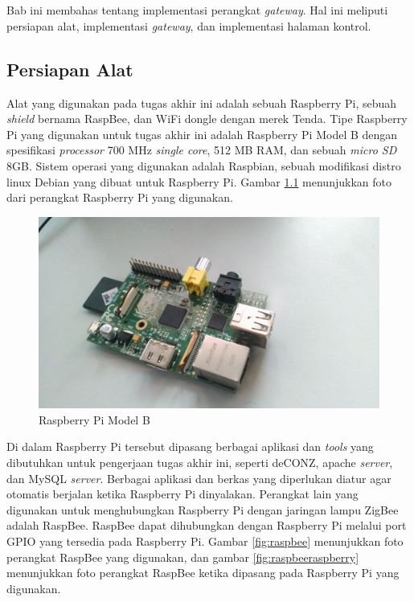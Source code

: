 \chapter{\babEmpat}
Bab ini membahas tentang implementasi perangkat \textit{gateway}. Hal ini meliputi persiapan alat, implementasi \textit{gateway}, dan implementasi halaman kontrol.

\section{Persiapan Alat}
Alat yang digunakan pada tugas akhir ini adalah sebuah Raspberry Pi, sebuah \textit{shield} bernama RaspBee, dan WiFi dongle dengan merek Tenda. Tipe Raspberry Pi yang digunakan untuk tugas akhir ini adalah Raspberry Pi Model B dengan spesifikasi \textit{processor} 700 MHz \textit{single core}, 512 MB RAM, dan sebuah \textit{micro SD} 8GB. Sistem operasi yang digunakan adalah Raspbian, sebuah modifikasi distro linux Debian yang dibuat untuk Raspberry Pi. Gambar \ref{fig:raspberry} menunjukkan foto dari perangkat Raspberry Pi yang digunakan.

\begin{figure}
	\centering
	\includegraphics[width=.9\textwidth]{pics/raspberry.jpg}
	\caption{Raspberry Pi Model B}
	\label{fig:raspberry}
\end{figure}

Di dalam Raspberry Pi tersebut dipasang berbagai aplikasi dan \textit{tools} yang dibutuhkan untuk pengerjaan tugas akhir ini, seperti deCONZ, apache \textit{server}, dan MySQL \textit{server}. Berbagai aplikasi dan berkas yang diperlukan diatur agar otomatis berjalan ketika Raspberry Pi dinyalakan. Perangkat lain yang digunakan untuk menghubungkan Raspberry Pi dengan jaringan lampu ZigBee adalah RaspBee. RaspBee dapat dihubungkan dengan Raspberry Pi melalui port GPIO yang tersedia pada Raspberry Pi. Gambar \ref{fig:raspbee} menunjukkan foto perangkat RaspBee yang digunakan, dan gambar \ref{fig:raspbeeraspberry} menunjukkan foto perangkat RaspBee ketika dipasang pada Raspberry Pi yang digunakan.

